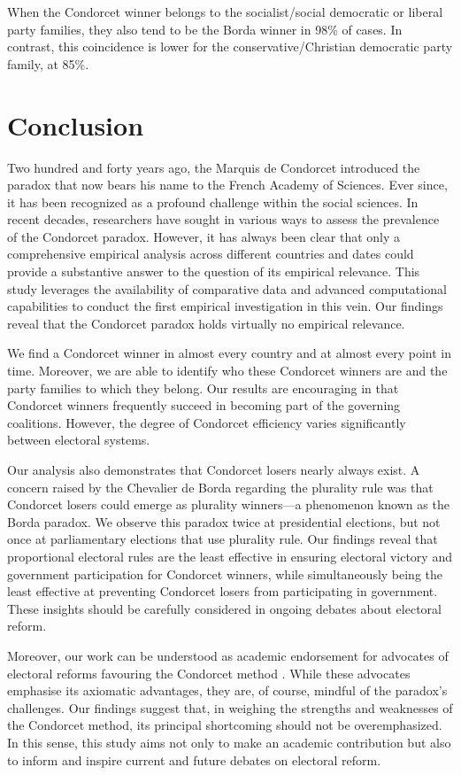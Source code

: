 \documentclass[12pt]{scrartcl}
\begin{document}
When the Condorcet winner belongs to the socialist/social democratic or liberal party families, they also tend to be the Borda winner in 98\% of cases. In contrast, this coincidence is lower for the conservative/Christian democratic party family, at 85\%. 

\section{Conclusion}
Two hundred and forty years ago, the Marquis de Condorcet introduced the paradox that now bears his name to the French Academy of Sciences. Ever since, it has been recognized as a profound challenge within the social sciences. In recent decades, researchers have sought in various ways to assess the prevalence of the Condorcet paradox. However, it has always been clear that only a comprehensive empirical analysis across different countries and dates could provide a substantive answer to the question of its empirical relevance. This study leverages the availability of comparative data and advanced computational capabilities to conduct the first empirical investigation in this vein. Our findings reveal that the Condorcet paradox holds virtually no empirical relevance.

We find a Condorcet winner in almost every country and at almost every point in time. Moreover, we are able to identify who these Condorcet winners are and the party families to which they belong. Our results are encouraging in that Condorcet winners frequently succeed in becoming part of the governing coalitions. However, the degree of Condorcet efficiency varies significantly between electoral systems.

Our analysis also demonstrates that Condorcet losers nearly always exist. A concern raised by the Chevalier de Borda regarding the plurality rule was that Condorcet losers could emerge as plurality winners—a phenomenon known as the Borda paradox. We observe this paradox twice at presidential elections, but not once at parliamentary elections that use plurality rule. Our findings reveal that proportional electoral rules are the least effective in ensuring electoral victory and government participation for Condorcet winners, while simultaneously being the least effective at preventing Condorcet losers from participating in government. These insights should be carefully considered in ongoing debates about electoral reform.

Moreover, our work can be understood as academic endorsement for advocates of electoral reforms favouring the Condorcet method \citep{Maskin2016, Maskin2017, Maskin2017a}. While these advocates emphasise its axiomatic advantages, they are, of course, mindful of the paradox's challenges. Our findings suggest that, in weighing the strengths and weaknesses of the Condorcet method, its principal shortcoming should not be overemphasized. In this sense, this study aims not only to make an academic contribution but also to inform and inspire current and future debates on electoral reform.
\end{document}
